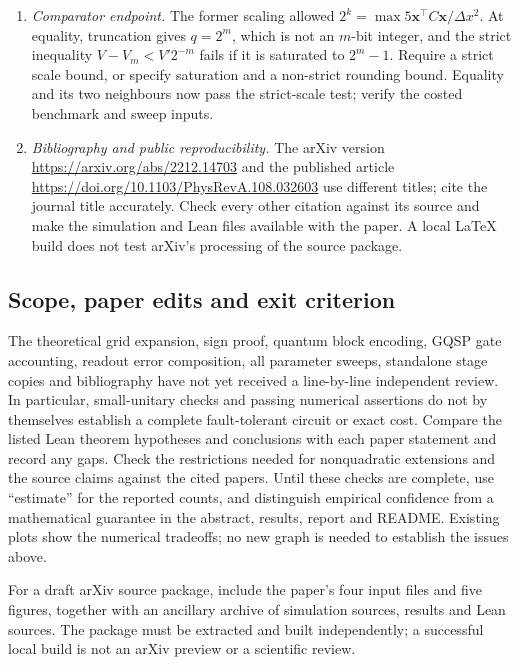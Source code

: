\documentclass[11pt,a4paper]{article}
\newcommand{\x}{\mathbf x}
\begin{document}
\begin{enumerate}
  $\eta_k=(k-(N_p-1)/2)\pi/L_p$. For even $N_p$,
  $e^{i\eta_k(p+2L_p)}=-e^{i\eta_kp}$: these are antiperiodic modes.
  Check the QFT phases, boundary wrap and circuit against the actual
  half-integer basis; state the convention and prove the wrap bound for it.
\item \emph{Comparator endpoint.} The former scaling allowed $2^k=\max 5\x^\top C\x/\Delta x^2$.
  At equality, truncation gives $q=2^m$, which is not an $m$-bit integer,
  and the strict inequality $V-V_m<V'2^{-m}$ fails if it is saturated to
  $2^m-1$. Require a strict scale bound, or specify saturation and a
  non-strict rounding bound. Equality and its two neighbours now pass the
  strict-scale test; verify the costed benchmark and sweep inputs.
\item \emph{Bibliography and public reproducibility.} The arXiv version
  \url{https://arxiv.org/abs/2212.14703} and the published article
  \url{https://doi.org/10.1103/PhysRevA.108.032603} use different titles;
  cite the journal title accurately. Check every other citation against its
  source and make the simulation and Lean files available with the paper.
  A local LaTeX build does not test arXiv's processing of the source package.
\end{enumerate}

\subsection*{Scope, paper edits and exit criterion}
The theoretical grid expansion, sign proof, quantum block encoding, GQSP
gate accounting, readout error composition, all parameter sweeps, standalone
stage copies and bibliography have not yet received a line-by-line independent
review. In particular, small-unitary checks and passing numerical assertions
do not by themselves establish a complete fault-tolerant circuit or exact
cost. Compare the listed Lean theorem hypotheses and conclusions with each
paper statement and record any gaps. Check the restrictions needed for
nonquadratic extensions and the source claims against the cited papers.
Until these checks are complete, use ``estimate'' for the reported counts,
and distinguish empirical confidence from a mathematical guarantee in the
abstract, results, report and README. Existing plots show the numerical
tradeoffs; no new graph is needed to establish the issues above.

For a draft arXiv source package, include the paper's four input files and
five figures, together with an ancillary archive of simulation sources,
results and Lean sources. The package must be extracted and built independently;
a successful local build is not an arXiv preview or a scientific review.
\end{document}
